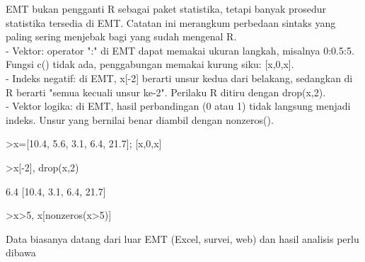 \documentclass[a4paper,10pt]{article}
\begin{document}
\begin{eulernotebook}
\begin{eulercomment}
\begin{eulercomment}
\begin{eulercomment}
\begin{eulercomment}
\begin{eulercomment}
\begin{eulercomment}
\begin{eulercomment}
\begin{eulercomment}
\begin{eulercomment}
\begin{eulercomment}
\begin{eulercomment}
\begin{eulercomment}
\begin{eulercomment}
\begin{eulercomment}
\begin{eulercomment}
\begin{eulercomment}
\begin{eulercomment}
\begin{eulercomment}
\begin{eulercomment}
\begin{eulercomment}
\begin{eulercomment}
\begin{eulercomment}
\begin{eulercomment}
\begin{eulercomment}
\begin{eulercomment}
EMT bukan pengganti R sebagai paket statistika, tetapi banyak prosedur statistika tersedia di
EMT. Catatan ini merangkum perbedaan sintaks yang paling sering menjebak bagi yang sudah
mengenal R.\\
- Vektor: operator ":" di EMT dapat memakai ukuran langkah, misalnya 0:0.5:5. Fungsi c() tidak ada, penggabungan memakai kurung siku: [x,0,x].\\
- Indeks negatif: di EMT, x[-2] berarti unsur kedua dari belakang, sedangkan di R berarti "semua kecuali unsur ke-2". Perilaku R ditiru dengan drop(x,2).\\
- Vektor logika: di EMT, hasil perbandingan (0 atau 1) tidak langsung menjadi indeks. Unsur yang bernilai benar diambil dengan nonzeros().
\end{eulercomment}
\begin{eulerprompt}
>x=[10.4, 5.6, 3.1, 6.4, 21.7]; [x,0,x]
\end{eulerprompt}
\begin{euleroutput}
  [10.4,  5.6,  3.1,  6.4,  21.7,  0,  10.4,  5.6,  3.1,  6.4,  21.7]
\end{euleroutput}
\begin{eulerprompt}
>x[-2], drop(x,2)
\end{eulerprompt}
\begin{euleroutput}
  6.4
  [10.4,  3.1,  6.4,  21.7]
\end{euleroutput}
\begin{eulerprompt}
>x>5, x[nonzeros(x>5)]
\end{eulerprompt}
\begin{euleroutput}
  [1,  1,  0,  1,  1]
  [10.4,  5.6,  6.4,  21.7]
\end{euleroutput}
\begin{eulercomment}
\begin{eulercomment}
\begin{eulercomment}
\end{eulercomment}
\begin{eulercomment}
Data biasanya datang dari luar EMT (Excel, survei, web) dan hasil analisis perlu dibawa

\end{eulercomment}
\end{eulercomment}
\end{eulercomment}
\end{eulercomment}
\end{eulercomment}
\end{eulercomment}
\end{eulercomment}
\end{eulercomment}
\end{eulercomment}
\end{eulercomment}
\end{eulercomment}
\end{eulercomment}
\end{eulercomment}
\end{eulercomment}
\end{eulercomment}
\end{eulercomment}
\end{eulercomment}
\end{eulercomment}
\end{eulercomment}
\end{eulercomment}
\end{eulercomment}
\end{eulercomment}
\end{eulercomment}
\end{eulercomment}
\end{eulercomment}
\end{eulercomment}
\end{eulercomment}
\end{eulernotebook}
\end{document}
